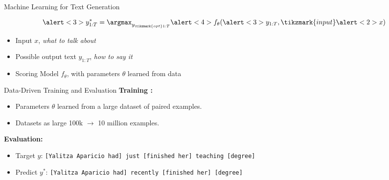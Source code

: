 \begin{frame}{Machine Learning for Text Generation}

  \[ \alert<3>{y^*_{1:T}} = \argmax_{y_{\tikzmark{opt}1:T}} \alert<4>{f}_{\theta}(\alert<3>{y_{1:T}}, \tikzmark{input}\alert<2>{x}) \]



  \begin{itemize}
    \pause
  \item Input \alert<2>{$x$},  \textit{what to talk about}
    \air
    \pause
  \item Possible output text \alert<3>{$y_{1:T}$}, \textit{how to say it}
    \air
    \pause
  \item Scoring Model \alert<4>{$f_{\theta}$}, with parameters $\theta$ learned from data
  \end{itemize}

\end{frame}

\begin{frame}{Data-Driven Training and Evaluation}
  \textbf{Training :}
  \begin{itemize}
  \item Parameters $\theta$ learned from a large dataset of paired examples. 
    \air 

  \item Datasets as large 100k $\rightarrow$ 10 million examples.
  \end{itemize}
  


    \pause

    \air 

  \textbf{Evaluation:}

  \begin{itemize}
  \item Target $\hat{y}$: \texttt{[Yalitza Aparicio had] just
      [finished her] teaching [degree]}

    \air  
  \item Predict $y^*$: \texttt{[Yalitza Aparicio had] recently [finished
      her] [degree]} 
  \end{itemize}
\end{frame}


